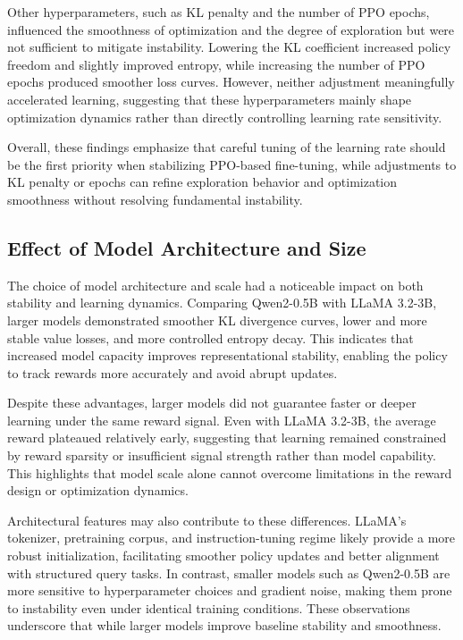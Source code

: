 Other hyperparameters, such as KL penalty and the number of PPO epochs, influenced the smoothness of optimization and the degree of exploration but were not sufficient to mitigate instability. Lowering the KL coefficient increased policy freedom and slightly improved entropy, while increasing the number of PPO epochs produced smoother loss curves. However, neither adjustment meaningfully accelerated learning, suggesting that these hyperparameters mainly shape optimization dynamics rather than directly controlling learning rate sensitivity.

Overall, these findings emphasize that careful tuning of the learning rate should be the first priority when stabilizing PPO-based fine-tuning, while adjustments to KL penalty or epochs can refine exploration behavior and optimization smoothness without resolving fundamental instability.

\subsection{Effect of Model Architecture and Size}
The choice of model architecture and scale had a noticeable impact on both stability and learning dynamics. Comparing Qwen2-0.5B with LLaMA 3.2-3B, larger models demonstrated smoother KL divergence curves, lower and more stable value losses, and more controlled entropy decay. This indicates that increased model capacity improves representational stability, enabling the policy to track rewards more accurately and avoid abrupt updates.

Despite these advantages, larger models did not guarantee faster or deeper learning under the same reward signal. Even with LLaMA 3.2-3B, the average reward plateaued relatively early, suggesting that learning remained constrained by reward sparsity or insufficient signal strength rather than model capability. This highlights that model scale alone cannot overcome limitations in the reward design or optimization dynamics.

Architectural features may also contribute to these differences. LLaMA’s tokenizer, pretraining corpus, and instruction-tuning regime likely provide a more robust initialization, facilitating smoother policy updates and better alignment with structured query tasks. In contrast, smaller models such as Qwen2-0.5B are more sensitive to hyperparameter choices and gradient noise, making them prone to instability even under identical training conditions. These observations underscore that while larger models improve baseline stability and smoothness.

